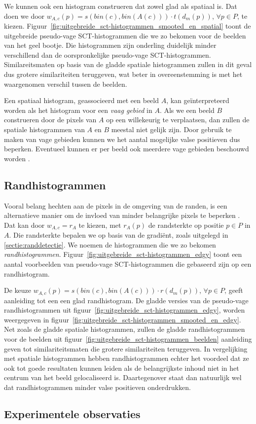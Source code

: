 We kunnen ook een histogram construeren dat zowel glad als spatiaal is. Dat doen we door
$w_{A,c}(p)=s(bin(c),bin(A(c))) \cdot t(d_m(p))$, $\forall p \in P$, te kiezen. 
Figuur~\ref{fig:uitgebreide_sct-histogrammen_smooted_en_spatial} toont de
uitgebreide pseudo-vage SCT-histogrammen die we zo bekomen voor de beelden van het geel
bootje. Die histogrammen zijn onderling duidelijk minder verschillend dan de oorspronkelijke
pseudo-vage SCT-histogrammen. Similareitsmaten op basis van de gladde spatiale histogrammen
zullen in dit geval dus grotere similariteiten teruggeven, wat beter in overeenstemming is met het 
waargenomen verschil tussen de beelden.
 
Een spatiaal histogram, geassocieerd met een beeld $A$, kan ge\"interpreteerd worden als het 
histogram voor een \emph{vaag gebied} in $A$. Als we een beeld $B$ construeren door de pixels
van $A$ op een willekeurig te verplaatsen, dan zullen de spatiale histogrammen van $A$ en $B$
meestal niet gelijk zijn. Door gebruik te maken van vage gebieden kunnen we het aantal mogelijke
valse positieven dus beperken. Eventueel kunnen er per beeld ook meerdere vage gebieden beschouwd
worden \cite{stricker:fuzzy_regions_for_image_indexing}.
 
\subsection{Randhistogrammen} 
 
Vooral belang hechten aan de pixels in de omgeving van de randen, is een alternatieve
manier om de invloed van minder belangrijke pixels te beperken 
\cite{vertan:upgrading_color_distribution_for_ir}. Dat kan door 
$w_{A,c}=r_{A}$ te kiezen, met $r_{A}(p)$ de randsterkte op positie $p \in P$ in $A$.
Die randsterkte bepalen we op basis van de gradi\"ent, zoals uitgelegd in \ref{sectie:randdetectie}.  
We noemen de histogrammen die we zo bekomen \emph{randhistogrammen}. 
Figuur~\ref{fig:uitgebreide_sct-histogrammen_edgy} toont een aantal voorbeelden van
pseudo-vage SCT-histogrammen die gebaseerd zijn op een randhistogram.

De keuze $w_{A,c}(p)=s(bin(c),bin(A(c))) \cdot r(d_m(p))$, $\forall p \in P$, geeft
aanleiding tot een een glad randhistogram. De gladde versies van de pseudo-vage
randhistogrammen uit figuur~\ref{fig:uitgebreide_sct-histogrammen_edgy}, worden
weergegeven in figuur~\ref{fig:uitgebreide_sct-histogrammen_smooted_en_edgy}. 
Net zoals de gladde spatiale histogrammen, zullen de
gladde randhistogrammen voor de beelden uit figuur~\ref{fig:uitgebreide_sct-histogrammen_beelden} 
aanleiding geven tot similariteitsmaten die grotere similariteiten teruggeven.
In vergelijking met spatiale histogrammen hebben randhistogrammen echter het
voordeel dat ze ook tot goede resultaten kunnen leiden als de belangrijkste inhoud niet
in het centrum van het beeld gelocaliseerd is. Daartegenover staat dan natuurlijk wel
dat randhistogrammen minder valse positieven onderdrukken.

\subsection{Experimentele observaties}